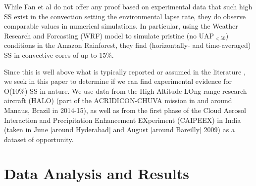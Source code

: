 \documentclass{article}
\begin{document}
While Fan et al do not offer any proof based on experimental data that such high SS exist in the convection setting the environmental lapse rate, they do observe comparable values in numerical simulations. In particular, using the Weather Research and Forcasting (WRF) model to simulate pristine (no UAP$_{<50}$) conditions in the Amazon Rainforest, they find (horizontally- and time-averaged) SS in convective cores of up to 15\%.

Since this is well above what is typically reported or assumed in the literature \cite{Hoppel1996, Yang2019, Koike2012, Politovich1988, Moteki2019, Siebert2017, Shen2018, Hammer2014, Li2019}, we seek in this paper to determine if we can find experimental evidence for O(10\%) SS in nature. We use data from the High-Altitude LOng-range research aircraft (HALO) (part of the ACRIDICON-CHUVA mission in and around Manaus, Brazil in 2014-15), as well as from the first phase of the Cloud Aerosol Interaction and Precipitation Enhancement EXperiment (CAIPEEX) in India (taken in June [around Hyderabad] and August [around Bareilly] 2009) \cite{Wendisch2016, Kulkarni2012} as a dataset of opportunity.

\section{Data Analysis and Results}
\end{document}
